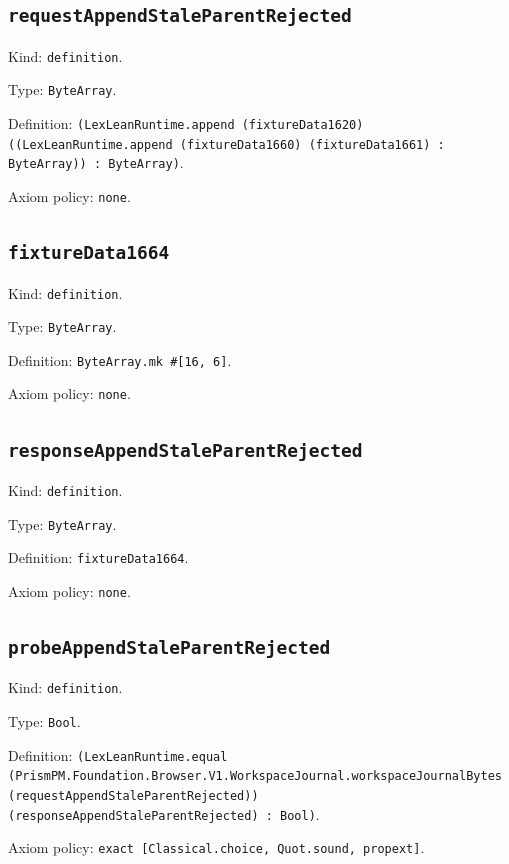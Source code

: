 \documentclass[11pt]{article}
\begin{document}
\subsection*{\texttt{requestAppendStaleParentRejected}}
\noindent Kind: \texttt{definition}.\par
\noindent Type: \texttt{ByteArray}.\par
\noindent Definition: \texttt{(LexLeanRuntime.append (fixtureData1620) ((LexLeanRuntime.append (fixtureData1660) (fixtureData1661) : ByteArray)) : ByteArray)}.\par
\noindent Axiom policy: \texttt{none}.\par
\subsection*{\texttt{fixtureData1664}}
\noindent Kind: \texttt{definition}.\par
\noindent Type: \texttt{ByteArray}.\par
\noindent Definition: \texttt{ByteArray.mk \#[16, 6]}.\par
\noindent Axiom policy: \texttt{none}.\par
\subsection*{\texttt{responseAppendStaleParentRejected}}
\noindent Kind: \texttt{definition}.\par
\noindent Type: \texttt{ByteArray}.\par
\noindent Definition: \texttt{fixtureData1664}.\par
\noindent Axiom policy: \texttt{none}.\par
\subsection*{\texttt{probeAppendStaleParentRejected}}
\noindent Kind: \texttt{definition}.\par
\noindent Type: \texttt{Bool}.\par
\noindent Definition: \texttt{(LexLeanRuntime.equal (PrismPM.Foundation.Browser.V1.WorkspaceJournal.workspaceJournalBytes (requestAppendStaleParentRejected)) (responseAppendStaleParentRejected) : Bool)}.\par
\noindent Axiom policy: \texttt{exact [Classical.choice, Quot.sound, propext]}.\par
\end{document}
